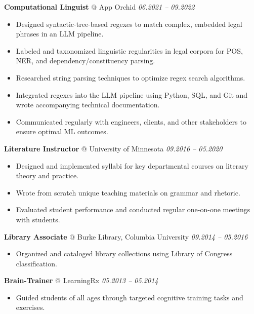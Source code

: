 \documentclass[10pt,letterpaper]{article}
\begin{document}
\vspace{0.4em}
\noindent\textbf{Computational Linguist} @ App Orchid \hfill \textit{06.2021 -- 09.2022}
\begin{itemize}[leftmargin=1.3em, itemsep=1.5pt, parsep=0pt, topsep=2pt]
    \item Designed syntactic-tree-based regexes to match complex, embedded legal phrases in an LLM pipeline.
    \item Labeled and taxonomized linguistic regularities in legal corpora for POS, NER, and dependency/constituency parsing.
    \item Researched string parsing techniques to optimize regex search algorithms.
    \item Integrated regexes into the LLM pipeline using Python, SQL, and Git and wrote accompanying technical documentation.
    \item Communicated regularly with engineers, clients, and other stakeholders to ensure optimal ML outcomes.
\end{itemize}

\vspace{0.4em}
\noindent\textbf{Literature Instructor} @ University of Minnesota \hfill \textit{09.2016 -- 05.2020}
\begin{itemize}[leftmargin=1.3em, itemsep=1.5pt, parsep=0pt, topsep=2pt]
    \item Designed and implemented syllabi for key departmental courses on literary theory and practice.
    \item Wrote from scratch unique teaching materials on grammar and rhetoric.
    \item Evaluated student performance and conducted regular one-on-one meetings with students.
\end{itemize}

\vspace{0.4em}
\noindent\textbf{Library Associate} @ Burke Library, Columbia University \hfill \textit{09.2014 -- 05.2016}
\begin{itemize}[leftmargin=1.3em, itemsep=1.5pt, parsep=0pt, topsep=2pt]
    \item Organized and cataloged library collections using Library of Congress classification.
\end{itemize}

\vspace{0.4em}
\noindent\textbf{Brain-Trainer} @ LearningRx \hfill \textit{05.2013 -- 05.2014}
\begin{itemize}[leftmargin=1.3em, itemsep=1.5pt, parsep=0pt, topsep=2pt]
    \item Guided students of all ages through targeted cognitive training tasks and exercises.
\end{itemize}
\end{document}
